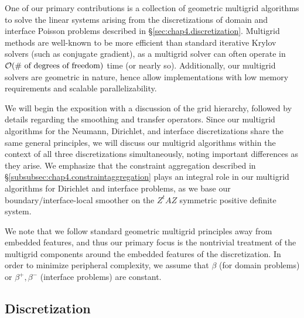 One of our primary contributions is a collection of geometric multigrid algorithms to solve the linear systems arising from the discretizations of domain and interface Poisson problems described in \S\ref{sec:chap4.discretization}. Multigrid methods are well-known to be more efficient than standard iterative Krylov solvers (such as conjugate gradient), as a multigrid solver can often operate in $\mathcal{O}(\text{\# of degrees of freedom})$ time (or nearly so). Additionally, our multigrid solvers are geometric in nature, hence allow implementations with low memory requirements and scalable parallelizability.

We will begin the exposition with a discussion of the grid hierarchy, followed by details regarding the smoothing and transfer operators. Since our multigrid algorithms for the Neumann, Dirichlet, and interface discretizations share the same general principles, we will discuss our multigrid algorithms within the context of all three discretizations simultaneously, noting important differences as they arise. We emphasize that the constraint aggregation described in \S\ref{subsubsec:chap4.constraintaggregation} plays an integral role in our multigrid algorithms for Dirichlet and interface problems, as we base our boundary/interface-local smoother on the $Z^tAZ$ symmetric positive definite system.

We note that we follow standard geometric multigrid principles away from embedded features, and thus our primary focus is the nontrivial treatment of the multigrid components around the embedded features of the discretization. In order to minimize peripheral complexity, we assume that $\beta$ (for domain problems) or $\beta^+, \beta^-$ (interface problems) are constant.

\subsection{Discretization} \label{subsec:chap4.multigrid.discretization}

